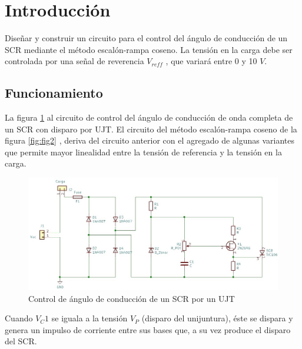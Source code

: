 \documentclass{article}
\begin{document}

\tableofcontents
\clearpage


\section{Introducción}
Diseñar y construir un circuito para el control del ángulo de conducción de un SCR mediante el método escalón-rampa coseno. La tensión en la carga debe ser controlada por una señal de reverencia $V_{reff}$ , que variará entre 0 y 10 $V$.


\subsection{Funcionamiento}
La figura \textcolor{blue}{\ref{fig:fig1}} al circuito de control del ángulo de conducción de onda completa de un SCR con disparo por UJT. El circuito del método escalón-rampa coseno de la figura \textcolor{blue}{\ref{fig:fig2}}  , deriva del circuito anterior con el agregado de algunas variantes que permite mayor linealidad entre la tensión de referencia y la tensión en la carga.

\begin{figure}[h]
 \begin{center}
	\includegraphics[scale=0.7]{imagenes/fig1.jpg} 
	\caption{Control de ángulo de conducción de un SCR por un UJT}\label{fig:fig1}
 \end{center}
\end{figure}

Cuando $V_C1$ se iguala a la tensión $V_P$ (disparo del unijuntura), éste se dispara y genera un impulso de corriente entre sus bases que, a su vez produce el disparo del SCR.
\end{document}
